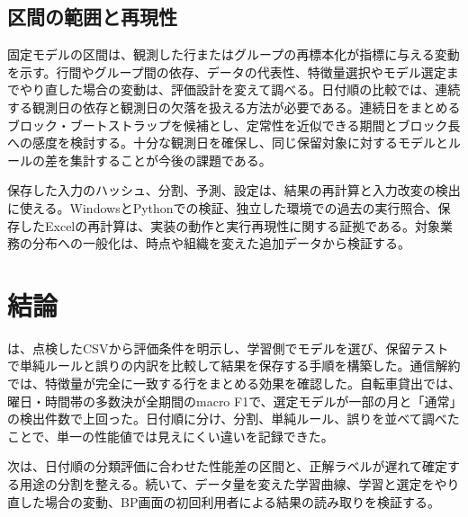 \subsection{区間の範囲と再現性}

固定モデルの区間は、観測した行またはグループの再標本化が指標に与える変動を示す。行間やグループ間の依存、データの代表性、特徴量選択やモデル選定までやり直した場合の変動は、評価設計を変えて調べる。日付順の比較では、連続する観測日の依存と観測日の欠落を扱える方法が必要である。連続日をまとめるブロック・ブートストラップ\cite{kuensch}を候補とし、定常性を近似できる期間とブロック長への感度を検討する。十分な観測日を確保し、同じ保留対象に対するモデルとルールの差を集計することが今後の課題である。

保存した入力のハッシュ、分割、予測、設定は、結果の再計算と入力改変の検出に使える。WindowsとPythonでの検証、独立した環境での過去の実行照合、保存したExcelの再計算は、実装の動作と実行再現性に関する証拠である。対象業務の分布への一般化は、時点や組織を変えた追加データから検証する。

\section{結論}

\project{}は、点検したCSVから評価条件を明示し、学習側でモデルを選び、保留テストで単純ルールと誤りの内訳を比較して結果を保存する手順を構築した。通信解約では、特徴量が完全に一致する行をまとめる効果を確認した。自転車貸出では、曜日・時間帯の多数決が全期間のmacro F1で、選定モデルが一部の月と「通常」の検出件数で上回った。日付順に分け、分割、単純ルール、誤りを並べて調べたことで、単一の性能値では見えにくい違いを記録できた。

次は、日付順の分類評価に合わせた性能差の区間と、正解ラベルが遅れて確定する用途の分割を整える。続いて、データ量を変えた学習曲線、学習と選定をやり直した場合の変動、BP画面の初回利用者による結果の読み取りを検証する。
